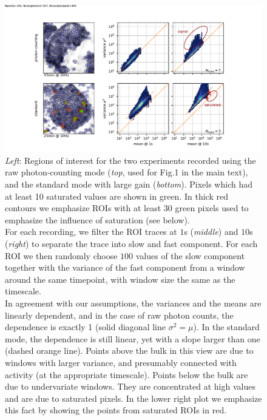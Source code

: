 \documentclass[a4paper,11pt,oneside,]{article}
\begin{document}
\begin{figure}[t]
 \centering
 \includegraphics[trim=25mm 0 20mm 10mm, clip,scale=0.9]{figures/mean_vs_var.pdf}
 \caption{
 {\it Left}: Regions of interest for the two experiments recorded using the raw photon-counting mode ({\it top}, used for {\color{red} Fig.1} in the main text), and the standard mode with large gain ({\it bottom}). Pixels which had at least 10 saturated values are shown in green. In thick red contours we emphasize ROIs with at least 30 green pixels used to emphasize the influence of saturation (see below).
 \\
 For each recording, we filter the ROI traces at $1$s ({\it middle}) and $10$s ({\it right}) to separate the trace into slow and fast component. For each ROI we then randomly choose $100$ values of the slow component together with the variance of the fast component from a window around the same timepoint, with window size the same as the timescale.
 \\
 In agreement with our assumptions, the variances and the means are linearly dependent, and in the case of raw photon counts, the dependence is exactly 1 (solid diagonal line $\sigma^2=\mu$). In the standard mode, the dependence is still linear, yet with a slope larger than one (dashed orange line). Points above the bulk in this view are due to windows with larger variance, and presumably connected with activity (at the appropriate timescale). Points below the bulk are due to undervariate windows. They are concentrated at high values and are due to saturated pixels. In the lower right plot we emphasize this fact by showing the points from saturated ROIs in red.
 }
 \label{fig:mean_vs_var}
\end{figure}
\end{document}
